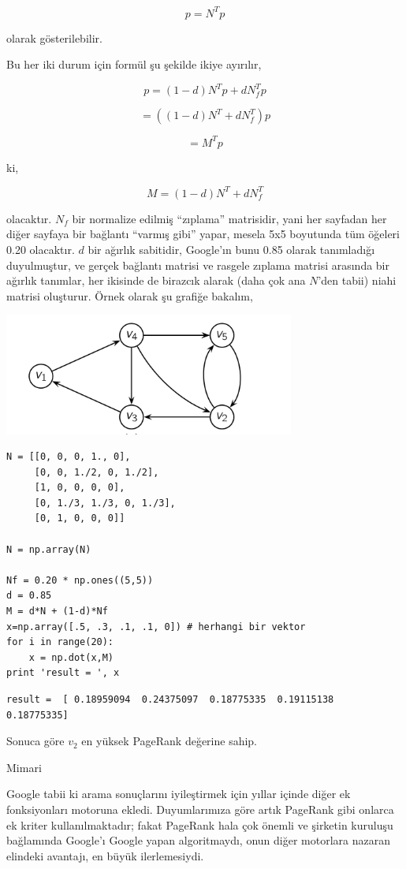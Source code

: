 \documentclass[12pt,fleqn]{article}\usepackage{../../common}
\begin{document}
$$ p = N^Tp $$ 

olarak gösterilebilir. 

Bu her iki durum için formül şu şekilde ikiye ayırılır,

$$ p = (1-d)N^Tp + dN_f^Tp $$

$$ = ((1-d)N^T + dN_f^T) p $$

$$ = M^Tp $$

ki,

$$M = (1-d)N^T + dN_f^T$$ 

olacaktır. $N_f$ bir normalize edilmiş ``zıplama'' matrisidir, yani her
sayfadan her diğer sayfaya bir bağlantı ``varmış gibi'' yapar, mesela 5x5
boyutunda tüm öğeleri 0.20 olacaktır. $d$ bir ağırlık sabitidir, Google'ın
bunu 0.85 olarak tanımladığı duyulmuştur, ve gerçek bağlantı matrisi ve
rasgele zıplama matrisi arasında bir ağırlık tanımlar, her ikisinde de
birazcık alarak (daha çok ana $N$'den tabii) niahi matrisi oluşturur. Örnek
olarak şu grafiğe bakalım, 

\includegraphics[height=4cm]{pg3.png}

\begin{verbatim}
N = [[0, 0, 0, 1., 0],
     [0, 0, 1./2, 0, 1./2],
     [1, 0, 0, 0, 0],
     [0, 1./3, 1./3, 0, 1./3],
     [0, 1, 0, 0, 0]]

N = np.array(N)

Nf = 0.20 * np.ones((5,5))
d = 0.85
M = d*N + (1-d)*Nf
x=np.array([.5, .3, .1, .1, 0]) # herhangi bir vektor
for i in range(20): 
    x = np.dot(x,M)
print 'result = ', x 
\end{verbatim}

\begin{verbatim}
result =  [ 0.18959094  0.24375097  0.18775335  0.19115138  0.18775335]
\end{verbatim}

Sonuca göre $v_2$ en yüksek PageRank değerine sahip. 

Mimari

Google tabii ki arama sonuçlarını iyileştirmek için yıllar içinde diğer ek
fonksiyonları motoruna ekledi. Duyumlarımıza göre artık PageRank gibi
onlarca ek kriter kullanılmaktadır; fakat PageRank hala çok önemli ve
şirketin kuruluşu bağlamında Google'ı Google yapan algoritmaydı, onun diğer
motorlara nazaran elindeki avantajı, en büyük ilerlemesiydi.
\end{document}
